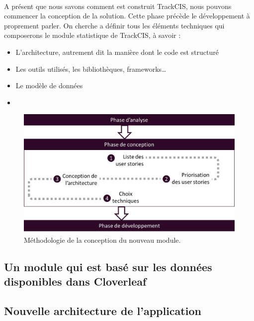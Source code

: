 		\paragraph{}
		A présent que nous savons comment est construit TrackCIS, nous pouvons
		commencer la conception de la solution. Cette phase précède le développement à
		proprement parler. On cherche a définir tous les éléments techniques qui
		composerons le module statistique de TrackCIS, à savoir :
		\begin{itemize}
		  \item L'architecture, autrement dit la manière dont le code est structuré
		  \item Les outils utilisés, les bibliothèques, frameworks\ldots
		  \item Le modèle de données
		  \item 
		\end{itemize}
		
		\begin{figure}[H]%
			\centering
			\includegraphics[width=15cm]{../img/part3/methodo_conception.png}
			\caption{\label{methodo_conception} Méthodologie de la conception du
			nouveau module.}
		\end{figure}
		
		\subsection{Un module qui est basé sur les données disponibles dans
		Cloverleaf}
		\subsection{Nouvelle architecture de l'application}
